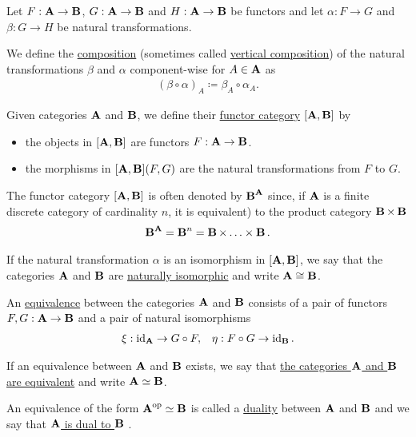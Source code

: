 \begin{definition}\label{def:natural_transformation_composition}
  Let $F: \operatorname{\mathbf{A}} \to \operatorname{\mathbf{B}}$, $G: \operatorname{\mathbf{A}} \to \operatorname{\mathbf{B}}$ and $H: \operatorname{\mathbf{A}} \to \operatorname{\mathbf{B}}$ be functors and let $\alpha: F \to G$ and $\beta: G \to H$ be natural transformations.

  We define the \ul{composition} (sometimes called \ul{vertical composition}) of the natural transformations $\beta$ and $\alpha$ component-wise for $A \in \operatorname{\mathbf{A}}$ as
  \begin{align*}
    (\beta \circ \alpha)_A \coloneqq \beta_{A} \circ \alpha_A.
  \end{align*}
\end{definition}

\begin{definition}\label{def:functor_category}
  Given categories $\operatorname{\mathbf{A}}$ and $\operatorname{\mathbf{B}}$, we define their \ul{functor category} $[\operatorname{\mathbf{A}}, \operatorname{\mathbf{B}}]$ by
  \begin{itemize}
    \item the objects in $[\operatorname{\mathbf{A}}, \operatorname{\mathbf{B}}]$ are functors $F: \operatorname{\mathbf{A}} \to \operatorname{\mathbf{B}}$.
    \item the morphisms in $[\operatorname{\mathbf{A}}, \operatorname{\mathbf{B}}](F, G)$ are the natural transformations from $F$ to $G$.
  \end{itemize}

  The functor category $[\operatorname{\mathbf{A}}, \operatorname{\mathbf{B}}]$ is often denoted by ${\operatorname{\mathbf{B}}}^{\operatorname{\mathbf{A}}}$ since, if $\operatorname{\mathbf{A}}$ is a finite discrete category of cardinality $n$, it is equivalent) to the product category $\operatorname{\mathbf{B}} \times \operatorname{\mathbf{B}}$
  \begin{align*}
    {\operatorname{\mathbf{B}}}^{\operatorname{\mathbf{A}}} = {\operatorname{\mathbf{B}}}^n = \operatorname{\mathbf{B}} \times \ldots \times \operatorname{\mathbf{B}}.
  \end{align*}

  If the natural transformation $\alpha$ is an isomorphism in $[\operatorname{\mathbf{A}}, \operatorname{\mathbf{B}}]$, we say that the categories $\operatorname{\mathbf{A}}$ and $\operatorname{\mathbf{B}}$ are \ul{naturally isomorphic} and write $\operatorname{\mathbf{A}} \cong \operatorname{\mathbf{B}}$.
\end{definition}

\begin{definition}\label{def:category_equivalence}\cite[definition 1.3.15]{Leinster2014}
  An \ul{equivalence} between the categories $\operatorname{\mathbf{A}}$ and $\operatorname{\mathbf{B}}$ consists of a pair of functors $F, G: \operatorname{\mathbf{A}} \to \operatorname{\mathbf{B}}$ and a pair of natural isomorphisms
  \begin{align*}
    \xi: \operatorname{id}_{\operatorname{\mathbf{A}}} \to G \circ F,
    &&
    \eta: F \circ G \to \operatorname{id}_{\operatorname{\mathbf{B}}}.
  \end{align*}

  If an equivalence between $\operatorname{\mathbf{A}}$ and $\operatorname{\mathbf{B}}$ exists, we say that \ul{the categories $\operatorname{\mathbf{A}}$ and $\operatorname{\mathbf{B}}$ are equivalent} and write $\operatorname{\mathbf{A}} \simeq \operatorname{\mathbf{B}}$.

  An equivalence of the form $\operatorname{\mathbf{A}}^{\operatorname{op}} \simeq \operatorname{\mathbf{B}}$ is called a \ul{duality} between $\operatorname{\mathbf{A}}$ and $\operatorname{\mathbf{B}}$ and we say that \ul{$\operatorname{\mathbf{A}}$ is dual to $\operatorname{\mathbf{B}}$} \cite[example 1.3.22]{Leinster2014}.
\end{definition}

